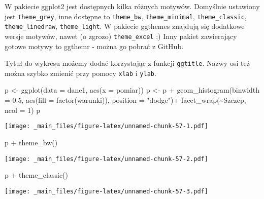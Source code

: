 \documentclass[
]{book}
\newenvironment{Shaded}{\begin{snugshade}}{\end{snugshade}}
\newcommand{\AttributeTok}[1]{\textcolor[rgb]{0.77,0.63,0.00}{#1}}
\newcommand{\DecValTok}[1]{\textcolor[rgb]{0.00,0.00,0.81}{#1}}
\newcommand{\FloatTok}[1]{\textcolor[rgb]{0.00,0.00,0.81}{#1}}
\newcommand{\FunctionTok}[1]{\textcolor[rgb]{0.00,0.00,0.00}{#1}}
\newcommand{\NormalTok}[1]{#1}
\newcommand{\OtherTok}[1]{\textcolor[rgb]{0.56,0.35,0.01}{#1}}
\newcommand{\SpecialCharTok}[1]{\textcolor[rgb]{0.00,0.00,0.00}{#1}}
\newcommand{\StringTok}[1]{\textcolor[rgb]{0.31,0.60,0.02}{#1}}
\begin{document}
W pakiecie ggplot2 jest dostępnych kilka różnych motywów. Domyślnie ustawiony jest \texttt{theme\_grey}, inne dostępne to \texttt{theme\_bw}, \texttt{theme\_minimal}, \texttt{theme\_classic}, \texttt{theme\_linedraw}, \texttt{theme\_light}. W pakiecie ggthemes znajdują się dodatkowe wersje motywów, nawet (o zgrozo) \texttt{theme\_excel} ;) Inny pakiet zawierający gotowe motywy to ggthemr - można go pobrać z GitHub.

Tytuł do wykresu możemy dodać korzystając z funkcji \texttt{ggtitle}. Nazwy osi też można szybko zmienić przy pomocy \texttt{xlab} i \texttt{ylab}.

\begin{Shaded}
\begin{Highlighting}[]
\NormalTok{p }\OtherTok{\textless{}{-}} \FunctionTok{ggplot}\NormalTok{(}\AttributeTok{data =}\NormalTok{ dane1, }\FunctionTok{aes}\NormalTok{(}\AttributeTok{x =}\NormalTok{ pomiar))}
\NormalTok{p }\OtherTok{\textless{}{-}}\NormalTok{ p }\SpecialCharTok{+} \FunctionTok{geom\_histogram}\NormalTok{(}\AttributeTok{binwidth =} \FloatTok{0.5}\NormalTok{, }\FunctionTok{aes}\NormalTok{(}\AttributeTok{fill =} \FunctionTok{factor}\NormalTok{(warunki)), }\AttributeTok{position =} \StringTok{"dodge"}\NormalTok{)}\SpecialCharTok{+}
  \FunctionTok{facet\_wrap}\NormalTok{(}\SpecialCharTok{\textasciitilde{}}\NormalTok{Szczep, }\AttributeTok{ncol =} \DecValTok{1}\NormalTok{)}
\NormalTok{p}
\end{Highlighting}
\end{Shaded}

\texttt{[image: \_main\_files/figure-latex/unnamed-chunk-57-1.pdf]}

\begin{Shaded}
\begin{Highlighting}[]
\NormalTok{p }\SpecialCharTok{+} \FunctionTok{theme\_bw}\NormalTok{()}
\end{Highlighting}
\end{Shaded}

\texttt{[image: \_main\_files/figure-latex/unnamed-chunk-57-2.pdf]}

\begin{Shaded}
\begin{Highlighting}[]
\NormalTok{p }\SpecialCharTok{+} \FunctionTok{theme\_classic}\NormalTok{()}
\end{Highlighting}
\end{Shaded}

\texttt{[image: \_main\_files/figure-latex/unnamed-chunk-57-3.pdf]}
\end{document}
